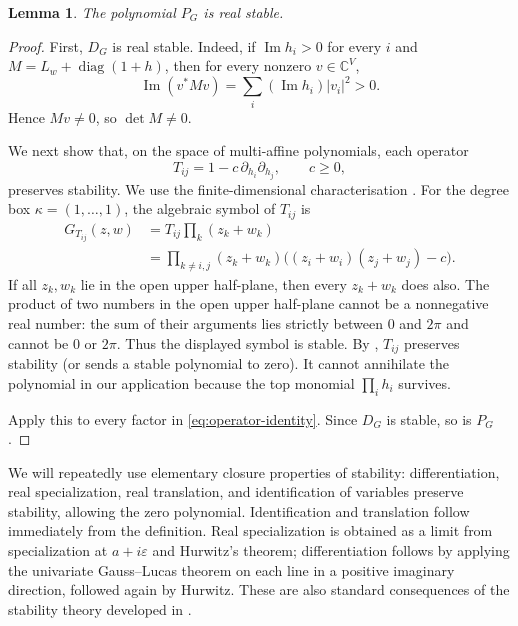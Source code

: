 \documentclass[11pt]{article}
\newtheorem{lemma}[theorem]{Lemma}
\theoremstyle{definition}
\theoremstyle{remark}
\newcommand{\1}{\mathbf 1}
\newcommand{\diag}{\operatorname{diag}}
\begin{document}
\begin{lemma}\label{lem:PG-stable}
The polynomial $P_G$ is real stable.
\end{lemma}

\begin{proof}
First, $D_G$ is real stable.  Indeed, if $\operatorname{Im}h_i>0$ for every $i$ and
$M=L_w+\diag(1+h)$, then for every nonzero $v\in\mathbb C^V$,
\begin{equation}
 \operatorname{Im}(v^*Mv)=\sum_i(\operatorname{Im}h_i)|v_i|^2>0.
\end{equation}
Hence $Mv\neq0$, so $\det M\neq0$.

We next show that, on the space of multi-affine polynomials, each operator
\begin{equation}
 T_{ij}=1-c\,\partial_{h_i}\partial_{h_j},\qquad c\ge0,
\end{equation}
preserves stability.  We use the finite-dimensional
characterisation \cite[Theorem~1.1]{BB}.  For the degree box
$\kappa=(1,\dots,1)$, the algebraic symbol of $T_{ij}$ is
\begin{equation}\begin{aligned}
 G_{T_{ij}}(z,w)
 &=T_{ij}\prod_{k}(z_k+w_k)\\
 &=\prod_{k\neq i,j}(z_k+w_k)
   \bigl((z_i+w_i)(z_j+w_j)-c\bigr).
\end{aligned}\end{equation}
If all $z_k,w_k$ lie in the open upper half-plane, then every $z_k+w_k$ does also.
The product of two numbers in the open upper half-plane cannot be a nonnegative real
number: the sum of their arguments lies strictly between $0$ and $2\pi$ and cannot be
$0$ or $2\pi$.  Thus the displayed symbol is stable.  By
\cite[Theorem~1.1]{BB}, $T_{ij}$ preserves stability (or sends a stable polynomial to
zero).  It cannot annihilate the polynomial in our application because the top
monomial $\prod_i h_i$ survives.

Apply this to every factor in \eqref{eq:operator-identity}.  Since $D_G$ is stable,
so is $P_G$.
\end{proof}

We will repeatedly use elementary closure properties of stability: differentiation,
real specialization, real translation, and identification of variables preserve
stability, allowing the zero polynomial.  Identification and translation follow
immediately from the definition.  Real specialization is obtained as a limit from
specialization at $a+i\varepsilon$ and Hurwitz's theorem; differentiation follows by
applying the univariate Gauss--Lucas theorem on each line in a positive imaginary
direction, followed again by Hurwitz.  These are also standard consequences of the
stability theory developed in \cite{BB,BBL}.
\end{document}
